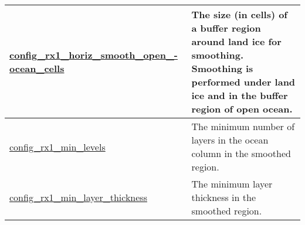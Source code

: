 {\begin{center}
\begin{longtable}{| p{2.0in} || p{4.0in} |}
    \hline
    \hyperref[subsec:nm_sec_config_rx1_horiz_smooth_open_ocean_cells]{config\_rx1\_horiz\_smooth\_open\_-}\hyperref[subsec:nm_sec_config_rx1_horiz_smooth_open_ocean_cells]{ocean\_cells}& The size (in cells) of a buffer region around land ice for smoothing.  Smoothing is performed under land ice and in the buffer region of open ocean. \\
    \hline
    \hyperref[subsec:nm_sec_config_rx1_min_levels]{config\_rx1\_min\_levels} & The minimum number of layers in the ocean column in the smoothed region. \\
    \hline
    \hyperref[subsec:nm_sec_config_rx1_min_layer_thickness]{config\_rx1\_min\_layer\_thickness} & The minimum layer thickness in the smoothed region. \\
    \hline
\end{longtable}
\end{center}
}
